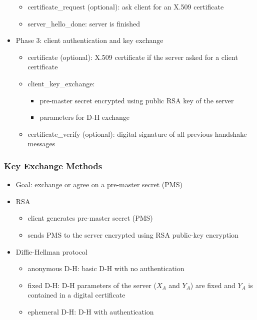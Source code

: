 \documentclass[final]{article}
\begin{document}
\begin{itemize}[nosep]
\begin{itemize}[nosep]
\begin{itemize}[nosep]
                    \end{itemize}
              \item certificate\_request (optional): ask client for an X.509 certificate
              \item server\_hello\_done: server is finished
          \end{itemize}
    \item Phase 3: client authentication and key exchange
          \begin{itemize}[nosep]
              \item certificate (optional): X.509 certificate if the server asked for a client certificate
              \item client\_key\_exchange:
                    \begin{itemize}[nosep]
                        \item pre-master secret encrypted using public RSA key of the server
                        \item parameters for D-H exchange
                    \end{itemize}
              \item certificate\_verify (optional): digital signature of all previous handshake messages
          \end{itemize}
\end{itemize}
\subsubsection*{Key Exchange Methods}
\begin{itemize}[nosep]
    \item Goal: exchange or agree on a pre-master secret (PMS)
    \item RSA
          \begin{itemize}[nosep]
              \item client generates pre-master secret (PMS)
              \item sends PMS to the server encrypted using RSA public-key encryption
          \end{itemize}
    \item Diffie-Hellman protocol
          \begin{itemize}[nosep]
              \item anonymous D-H: basic D-H with no authentication
              \item fixed D-H: D-H parameters of the server ($X_A$ and $Y_A$) are fixed and $Y_A$ is contained in a digital certificate
              \item ephemeral D-H: D-H with authentication
          \end{itemize}
\end{itemize}
\end{document}
